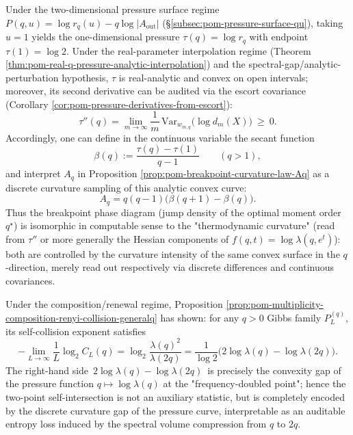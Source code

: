 \begin{remark}\label{rem:pom-breakpoint-curvature-thermo-realization}
Under the two-dimensional pressure surface regime \(P(q,u)=\log r_q(u)-q\log|A_{\mathrm{out}}|\) (\S\ref{subsec:pom-pressure-surface-qu}), taking \(u=1\) yields the one-dimensional pressure \(\tau(q)=\log r_q\) with endpoint \(\tau(1)=\log 2\).
Under the real-parameter interpolation regime (Theorem \ref{thm:pom-real-q-pressure-analytic-interpolation}) and the spectral-gap/analytic-perturbation hypothesis, \(\tau\) is real-analytic and convex on open intervals;
moreover, its second derivative can be audited via the escort covariance (Corollary \ref{cor:pom-pressure-derivatives-from-escort}):
\[
\tau''(q)=\lim_{m\to\infty}\frac{1}{m}\,\mathrm{Var}_{w_{m,q}}\!\bigl(\log d_m(X)\bigr)\ \ge\ 0.
\]
Accordingly, one can define in the continuous variable the secant function
\[
\beta(q):=\frac{\tau(q)-\tau(1)}{q-1}\qquad(q>1),
\]
and interpret \(A_q\) in Proposition \ref{prop:pom-breakpoint-curvature-law-Aq} as a discrete curvature sampling of this analytic convex curve:
\[
A_q=q(q-1)\bigl(\beta(q+1)-\beta(q)\bigr).
\]
Thus the breakpoint phase diagram (jump density of the optimal moment order \(q^\star\)) is isomorphic in computable sense to the "thermodynamic curvature" (read from \(\tau''\) or more generally the Hessian components of \(f(q,t)=\log\lambda(q,e^t)\)): both are controlled by the curvature intensity of the same convex surface in the \(q\)-direction, merely read out respectively via discrete differences and continuous covariances.
\end{remark}

\begin{remark}\label{rem:pom-two-point-collision-as-volume-gap}
Under the composition/renewal regime, Proposition \ref{prop:pom-multiplicity-composition-renyi-collision-generalq} has shown: for any \(q>0\) Gibbs family \(P_L^{(q)}\), its self-collision exponent satisfies
\[
-\lim_{L\to\infty}\frac{1}{L}\log_2 C_L(q)=\log_2\frac{\lambda(q)^2}{\lambda(2q)}
=\frac{1}{\log 2}\bigl(2\log\lambda(q)-\log\lambda(2q)\bigr).
\]
The right-hand side \(\,2\log\lambda(q)-\log\lambda(2q)\,\) is precisely the convexity gap of the pressure function \(q\mapsto\log\lambda(q)\) at the "frequency-doubled point";
hence the two-point self-intersection is not an auxiliary statistic, but is completely encoded by the discrete curvature gap of the pressure curve, interpretable as an auditable entropy loss induced by the spectral volume compression from \(q\) to \(2q\).
\end{remark}

